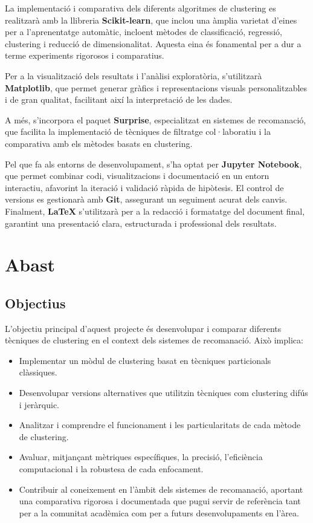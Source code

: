 \documentclass[a4paper,12pt]{report}
\begin{document}
La implementació i comparativa dels diferents algoritmes de clustering es realitzarà amb la llibreria \textbf{Scikit-learn}, que inclou una àmplia varietat d'eines per a l'aprenentatge automàtic, incloent mètodes de classificació, regressió, clustering i reducció de dimensionalitat. Aquesta eina és fonamental per a dur a terme experiments rigorosos i comparatius.

Per a la visualització dels resultats i l'anàlisi exploratòria, s'utilitzarà \textbf{Matplotlib}, que permet generar gràfics i representacions visuals personalitzables i de gran qualitat, facilitant així la interpretació de les dades.

A més, s'incorpora el paquet \textbf{Surprise}, especialitzat en sistemes de recomanació, que facilita la implementació de tècniques de filtratge col·laboratiu i la comparativa amb els mètodes basats en clustering.

Pel que fa als entorns de desenvolupament, s'ha optat per \textbf{Jupyter Notebook}, que permet combinar codi, visualitzacions i documentació en un entorn interactiu, afavorint la iteració i validació ràpida de hipòtesis.
El control de versions es gestionarà amb \textbf{Git}, assegurant un seguiment acurat dels canvis.
Finalment, \textbf{LaTeX} s'utilitzarà per a la redacció i formatatge del document final, garantint una presentació clara, estructurada i professional dels resultats.

\section{Abast}

\subsection{Objectius}

L'objectiu principal d'aquest projecte és desenvolupar i comparar diferents tècniques de clustering en el context dels sistemes de recomanació. Això implica: 

\begin{itemize} 
    \item Implementar un mòdul de clustering basat en tècniques particionals clàssiques. 
    \item Desenvolupar versions alternatives que utilitzin tècniques com clustering difús i jeràrquic. 
    \item Analitzar i comprendre el funcionament i les particularitats de cada mètode de clustering. 
    \item Avaluar, mitjançant mètriques específiques, la precisió, l'eficiència computacional i la robustesa de cada enfocament. 
    \item Contribuir al coneixement en l'àmbit dels sistemes de recomanació, aportant una comparativa rigorosa i documentada que pugui servir de referència tant per a la comunitat acadèmica com per a futurs desenvolupaments en l'àrea. 
\end{itemize}
\end{document}
